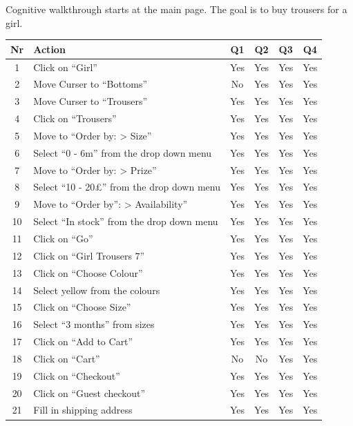 Cognitive walkthrough starts at the main page. The goal is to buy trousers for a girl.
\begin{table}[htdp]
\begin{center}
\begin{tabular}{|c|l|c|c|c|c|}
\hline
\textbf{Nr} & \textbf{Action} & \textbf{Q1} & \textbf{Q2} & \textbf{Q3} &\textbf{Q4} \\
\hline
1 & Click on ``Girl''& Yes & Yes & Yes & Yes\\
\hline
2 & Move Curser to ``Bottoms'' & No & Yes & Yes & Yes \\
\hline
3 & Move Curser to ``Trousers'' & Yes & Yes & Yes & Yes \\
\hline
4 & Click on ``Trousers'' & Yes & Yes & Yes & Yes \\
\hline
5 & Move to ``Order by: > Size'' & Yes & Yes & Yes & Yes \\
\hline
6 & Select ``0 - 6m'' from the drop down menu & Yes & Yes & Yes & Yes\\
\hline
7 & Move to ``Order by: > Prize'' & Yes & Yes & Yes & Yes \\
\hline
8 & Select ``10 - 20\pounds'' from the drop down menu & Yes & Yes & Yes & Yes\\
\hline
9 & Move to ``Order by'': > Availability'' & Yes & Yes & Yes & Yes \\
\hline
10 & Select ``In stock'' from the drop down menu & Yes & Yes & Yes & Yes\\
\hline
11 & Click on ``Go'' & Yes & Yes & Yes & Yes\\
\hline
12 & Click on ``Girl Trousers 7'' & Yes & Yes & Yes & Yes\\
\hline
13 & Click on ``Choose Colour'' & Yes & Yes & Yes & Yes\\
\hline
14 & Select yellow from the colours & Yes & Yes & Yes & Yes\\
\hline
15 & Click on ``Choose Size'' & Yes & Yes & Yes & Yes\\
\hline
16 & Select ``3 months'' from sizes & Yes & Yes & Yes & Yes\\
\hline
17 & Click on ``Add to Cart'' & Yes & Yes & Yes & Yes\\
\hline
18 & Click on ``Cart'' & No & No & Yes & Yes\\
\hline
19 & Click on ``Checkout'' & Yes & Yes & Yes & Yes\\
\hline
20 & Click on ``Guest checkout'' & Yes & Yes & Yes & Yes\\
\hline
21 & Fill in shipping address & Yes & Yes & Yes & Yes\\

\end{tabular}
\end{center}
\end{table}
